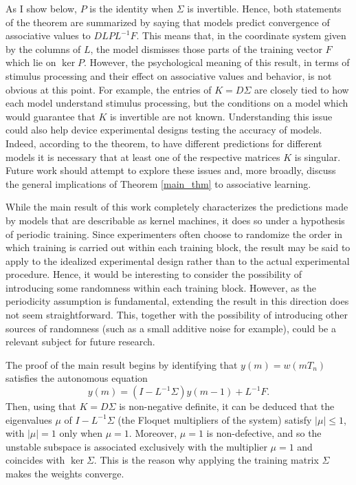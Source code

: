 \documentclass[]{interact}
\theoremstyle{plain}%
\theoremstyle{definition}
\theoremstyle{remark}
\newcommand{\abs}[1]{\left\vert#1\right\vert}
\begin{document}
As I show below, $P$ is the identity when $\Sigma$ is invertible. Hence, both statements of the theorem are summarized by saying that models predict convergence of associative values to $DLPL^{-1}F$. This means that, in the coordinate system given by the columns of $L$, the model dismisses those parts of the training vector $F$ which lie on $\ker P$. However, the psychological meaning of this result, in terms of stimulus processing and their effect on associative values and behavior, is not obvious at this point. For example, the entries of $K=D\Sigma$ are closely tied to how each model understand stimulus processing, but the conditions on a model which would guarantee that $K$ is invertible are not known. 
Understanding this issue could also help device experimental designs testing the accuracy of models. Indeed, according to the theorem, to have different predictions for different models it is necessary that at least one of the respective matrices $K$ is singular. 
Future work should attempt to explore these issues and, more broadly, discuss the general implications of Theorem \ref{main_thm} to associative learning.

While the main result of this work completely characterizes the predictions made by models that are describable as kernel machines, it does so under a hypothesis of periodic training. Since experimenters often choose to randomize the order in which training is carried out within each training block, the result may be said to apply to the idealized experimental design rather than to the actual experimental procedure.  Hence, it would be interesting to consider the possibility of introducing some randomness within each training block. However, as the periodicity assumption is fundamental, extending the result in this direction does not seem straightforward. This, together with the possibility of introducing other sources of randomness (such as a small additive noise for example), could be a relevant subject for future research. 

The proof of the main result begins by identifying that $y(m)=w(mT_n)$ satisfies the autonomous equation
\[
y(m)=(I-L^{-1}\Sigma)y(m-1)+L^{-1}F.
\]
Then, using that $K=D\Sigma$ is non-negative definite, it can be deduced that the eigenvalues $\mu$ of $I-L^{-1}\Sigma$ (the Floquet multipliers of the system) satisfy $\abs{\mu}\leq 1$, with $\abs{\mu}=1$ only when $\mu=1$. Moreover, $\mu=1$ is non-defective, and so the unstable subspace is associated exclusively with the multiplier $\mu=1$ and coincides with $\ker \Sigma$. This is the reason why applying the training matrix $\Sigma$ makes the weights converge. 
\end{document}
